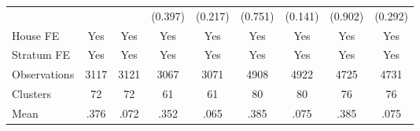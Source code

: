 {\begin{tabular}{l*{8}{c}}
                &                  &                  &  (0.397)         &  (0.217)         &  (0.751)         &  (0.141)         &  (0.902)         &  (0.292)         \\
House FE        &      Yes         &      Yes         &      Yes         &      Yes         &      Yes         &      Yes         &      Yes         &      Yes         \\
Stratum FE      &      Yes         &      Yes         &      Yes         &      Yes         &      Yes         &      Yes         &      Yes         &      Yes         \\
\midrule
Observations    &     3117         &     3121         &     3067         &     3071         &     4908         &     4922         &     4725         &     4731         \\
Clusters        &       72         &       72         &       61         &       61         &       80         &       80         &       76         &       76         \\
Mean            &     .376         &     .072         &     .352         &     .065         &     .385         &     .075         &     .385         &     .075         \\
\bottomrule
\end{tabular}
}
